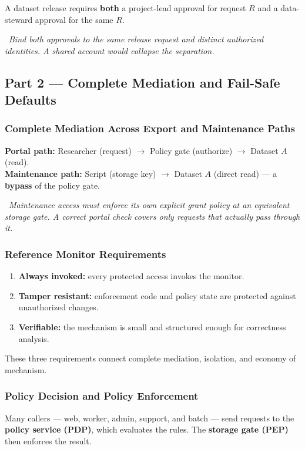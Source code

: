 \documentclass[hidelinks]{article}
\newcommand{\callout}[1]{\par\smallskip\noindent{\color{capri}$\blacktriangleright$}\ \textit{#1}\par\smallskip}
\begin{document}
A dataset release requires \textbf{both} a project-lead approval for request $R$ and a data-steward approval for the same $R$.

\callout{Bind both approvals to the same release request and distinct authorized identities. A shared account would collapse the separation.}

\subsection{Part 2 --- Complete Mediation and Fail-Safe Defaults}

\subsubsection{Complete Mediation Across Export and Maintenance Paths}

\textbf{Portal path:} Researcher (request) $\to$ Policy gate (authorize) $\to$ Dataset $A$ (read).\\
\textbf{Maintenance path:} Script (storage key) $\to$ Dataset $A$ (direct read) --- a \textbf{bypass} of the policy gate.

\callout{Maintenance access must enforce its own explicit grant policy at an equivalent storage gate. A correct portal check covers only requests that actually pass through it.}

\subsubsection{Reference Monitor Requirements}

\begin{enumerate}
    \item \textbf{Always invoked:} every protected access invokes the monitor.
    \item \textbf{Tamper resistant:} enforcement code and policy state are protected against unauthorized changes.
    \item \textbf{Verifiable:} the mechanism is small and structured enough for correctness analysis.
\end{enumerate}
These three requirements connect complete mediation, isolation, and economy of mechanism.

\subsubsection{Policy Decision and Policy Enforcement}

Many callers --- web, worker, admin, support, and batch --- send requests to the \textbf{policy service (PDP)}, which evaluates the rules. The \textbf{storage gate (PEP)} then enforces the result.
\end{document}

